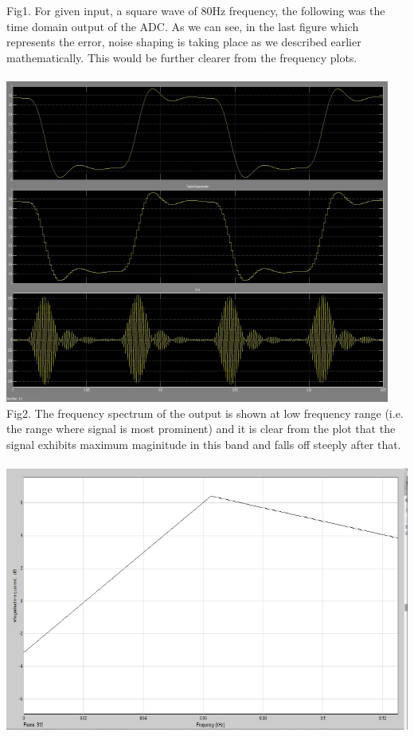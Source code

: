 \documentclass[colorlinks=true,pdfstartview=FitV,linkcolor=blue,
            citecolor=red,urlcolor=magenta]{ligodoc}
\begin{document}
Fig1. For given input, a square wave of 80Hz frequency, the following was the time domain output of the ADC. As we can see, in the last figure which represents the error, noise shaping is taking place as we described earlier mathematically. This would be further clearer from the frequency plots. \\ \\\includegraphics[scale=0.3]{ADC_Conversion_Quant_Noise_In_Time_Domain}
Fig2. The frequency spectrum of the output is shown at low frequency range (i.e. the range where signal is most prominent) and it is clear from the plot that the signal exhibits maximum maginitude in this band and falls off steeply after that. \\ \\\includegraphics[scale=0.5]{Output_Spectrum_Low_Range}
\end{document}
